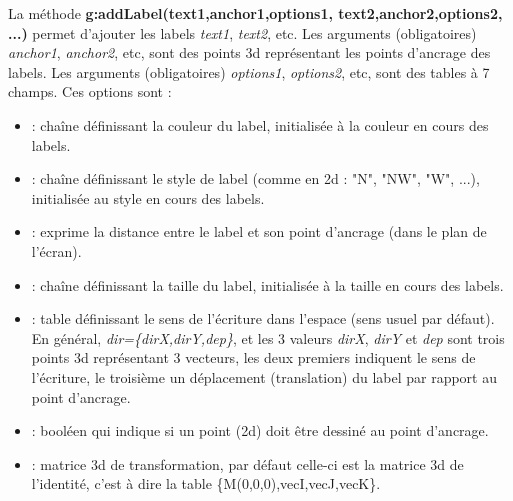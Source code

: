 La méthode \textbf{g:addLabel(text1,anchor1,options1, text2,anchor2,options2, ...)} permet d'ajouter les labels \emph{text1}, \emph{text2}, etc. Les arguments (obligatoires) \emph{anchor1}, \emph{anchor2}, etc, sont des points 3d représentant les points d'ancrage des labels. Les arguments (obligatoires) \emph{options1}, \emph{options2}, etc, sont des tables à 7 champs. Ces options sont :
\begin{itemize}
    \item {} : chaîne définissant la couleur du label, initialisée à la couleur en cours des labels.
    \item {} : chaîne définissant le style de label (comme en 2d : "N", "NW", "W", ...),  initialisée au style en cours des labels.
    \item {} : exprime la distance entre le label et son point d'ancrage (dans le plan de l'écran).
    \item {} : chaîne définissant la taille du label,  initialisée à la taille en cours des labels.
    \item {} : table définissant le sens de l'écriture dans l'espace (sens usuel par défaut).
    En général, \emph{dir=\{dirX,dirY,dep\}}, et les 3 valeurs \emph{dirX}, \emph{dirY} et \emph{dep} sont trois points 3d représentant 3 vecteurs, les deux premiers indiquent le sens de l'écriture, le troisième un déplacement (translation) du label par rapport au point d'ancrage.
    \item {} : booléen qui indique si un point (2d) doit être dessiné au point d'ancrage.
    \item {} : matrice 3d de transformation, par défaut celle-ci est la matrice 3d de l'identité, c'est à dire la table \{M(0,0,0),vecI,vecJ,vecK\}.
\end{itemize}

